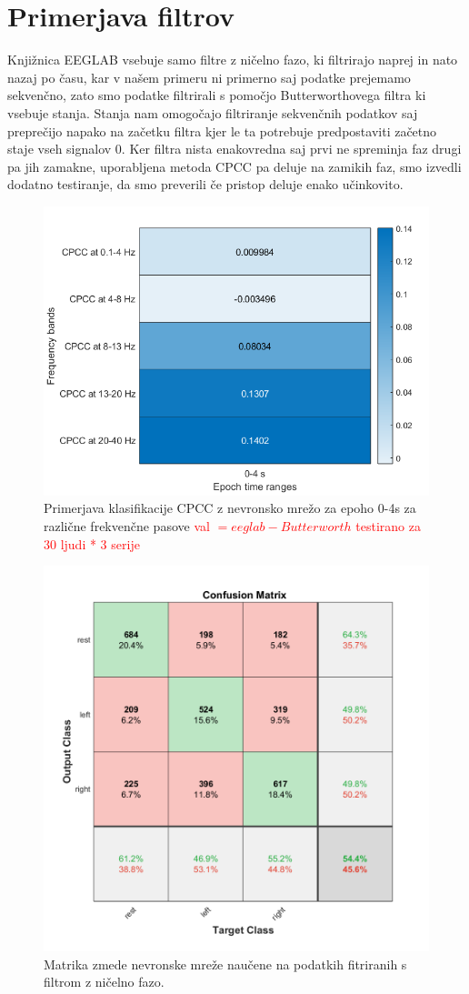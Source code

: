 \section{Primerjava filtrov}
Knjižnica EEGLAB vsebuje samo filtre z ničelno fazo, ki filtrirajo naprej in nato nazaj po času, kar v našem primeru ni primerno saj podatke prejemamo sekvenčno, zato smo podatke filtrirali s pomočjo Butterworthovega filtra ki vsebuje stanja. Stanja nam omogočajo filtriranje sekvenčnih podatkov saj preprečijo napako na začetku filtra kjer le ta potrebuje predpostaviti začetno staje vseh signalov 0. Ker filtra nista enakovredna saj prvi ne spreminja faz drugi pa jih zamakne, uporabljena metoda CPCC pa deluje na zamikih faz, smo izvedli dodatno testiranje, da smo preverili če pristop deluje enako učinkovito.
\begin{figure}[h!]
    \begin{center}
    \includegraphics[width=0.5\linewidth]{slike/ComparisonFilters.png}
    \end{center}
    \caption{Primerjava klasifikacije CPCC z nevronsko mrežo za epoho 0-4s za različne frekvenčne pasove \textcolor{red}{ val $= eeglab - Butterworth$ testirano za 30 ljudi * 3 serije} }
\end{figure}

\begin{figure}[h!]
    \begin{center}
    \includegraphics[width=0.5\linewidth]{slike/Confusion_eeglab.png}
    \end{center}
    \caption{Matrika zmede nevronske mreže naučene na podatkih fitriranih s filtrom z ničelno fazo.}
    \end{figure}
    
